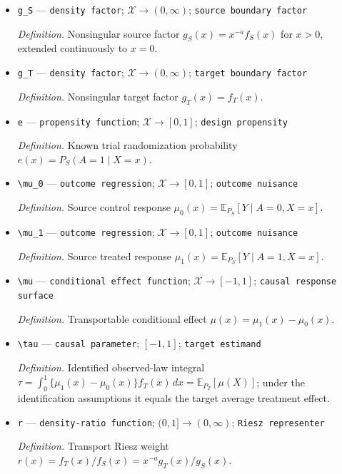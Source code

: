 \documentclass{article}
\begin{document}
\begin{itemize}
  \item \texttt{g\_\allowbreak{}S} --- \texttt{density factor}; \(\mathcal X\to(0,\infty)\); \texttt{source boundary factor}
  \par\smallskip\noindent\emph{Definition.} Nonsingular source factor \(g_S(x)=x^{-a}f_S(x)\) for \(x>0\), extended continuously to \(x=0\).
  \item \texttt{g\_\allowbreak{}T} --- \texttt{density factor}; \(\mathcal X\to(0,\infty)\); \texttt{target boundary factor}
  \par\smallskip\noindent\emph{Definition.} Nonsingular target factor \(g_T(x)=f_T(x)\).
  \item \texttt{e} --- \texttt{propensity function}; \(\mathcal X\to[0,1]\); \texttt{design propensity}
  \par\smallskip\noindent\emph{Definition.} Known trial randomization probability \(e(x)=P_S(A=1\mid X=x)\).
  \item \texttt{\textbackslash{}\allowbreak{}mu\_\allowbreak{}0} --- \texttt{outcome regression}; \(\mathcal X\to[0,1]\); \texttt{outcome nuisance}
  \par\smallskip\noindent\emph{Definition.} Source control response \(\mu_0(x)=\mathbb E_{P_S}[Y\mid A=0,X=x]\).
  \item \texttt{\textbackslash{}\allowbreak{}mu\_\allowbreak{}1} --- \texttt{outcome regression}; \(\mathcal X\to[0,1]\); \texttt{outcome nuisance}
  \par\smallskip\noindent\emph{Definition.} Source treated response \(\mu_1(x)=\mathbb E_{P_S}[Y\mid A=1,X=x]\).
  \item \texttt{\textbackslash{}\allowbreak{}mu} --- \texttt{conditional effect function}; \(\mathcal X\to[-1,1]\); \texttt{causal response surface}
  \par\smallskip\noindent\emph{Definition.} Transportable conditional effect \(\mu(x)=\mu_1(x)-\mu_0(x)\).
  \item \texttt{\textbackslash{}\allowbreak{}tau} --- \texttt{causal parameter}; \([-1,1]\); \texttt{target estimand}
  \par\smallskip\noindent\emph{Definition.} Identified observed-law integral \(\tau=\int_0^1\{\mu_1(x)-\mu_0(x)\}f_T(x)\,dx=\mathbb E_{P_T}[\mu(X)]\); under the identification assumptions it equals the target average treatment effect.
  \item \texttt{r} --- \texttt{density-\allowbreak{}ratio function}; \((0,1]\to(0,\infty)\); \texttt{Riesz representer}
  \par\smallskip\noindent\emph{Definition.} Transport Riesz weight \(r(x)=f_T(x)/f_S(x)=x^{-a}g_T(x)/g_S(x)\).

\end{itemize}
\end{document}
